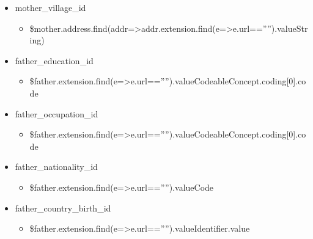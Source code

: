\documentclass[letterpaper,10pt,english]{sphinxmanual}
\begin{document}
\begin{itemize}
\begin{itemize}
\end{itemize}

\item {} 
\sphinxAtStartPar
mother\_village\_id
\begin{itemize}
\item {} 
\sphinxAtStartPar
\$mother.address.find(addr=\textgreater{}addr.extension.find(e=\textgreater{}e.url==””).valueString)

\end{itemize}

\item {} 
\sphinxAtStartPar
father\_education\_id
\begin{itemize}
\item {} 
\sphinxAtStartPar
\$father.extension.find(e=\textgreater{}e.url==””).valueCodeableConcept.coding{[}0{]}.code

\end{itemize}

\item {} 
\sphinxAtStartPar
father\_occupation\_id
\begin{itemize}
\item {} 
\sphinxAtStartPar
\$father.extension.find(e=\textgreater{}e.url==””).valueCodeableConcept.coding{[}0{]}.code

\end{itemize}

\item {} 
\sphinxAtStartPar
father\_nationality\_id
\begin{itemize}
\item {} 
\sphinxAtStartPar
\$father.extension.find(e=\textgreater{}e.url==””).valueCode

\end{itemize}

\item {} 
\sphinxAtStartPar
father\_country\_birth\_id
\begin{itemize}
\item {} 
\sphinxAtStartPar
\$father.extension.find(e=\textgreater{}e.url==””).valueIdentifier.value

\end{itemize}


\end{itemize}
\end{document}
